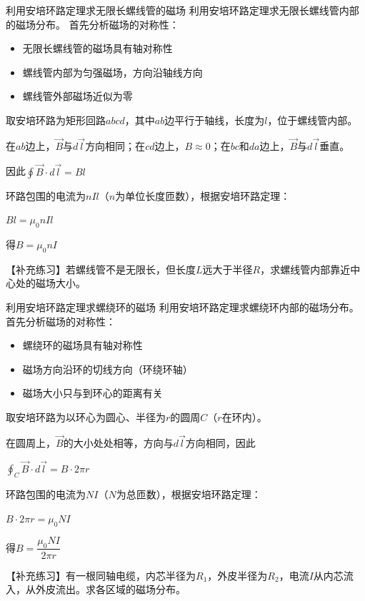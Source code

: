 \begin{example}{利用安培环路定理求无限长螺线管的磁场}
    利用安培环路定理求无限长螺线管内部的磁场分布。
    \tcblower
    首先分析磁场的对称性：
    \begin{itemize}
        \item 无限长螺线管的磁场具有轴对称性
        \item 螺线管内部为匀强磁场，方向沿轴线方向
        \item 螺线管外部磁场近似为零
    \end{itemize}

    取安培环路为矩形回路$abcd$，其中$ab$边平行于轴线，长度为$l$，位于螺线管内部。

    在$ab$边上，$\vec{B}$与$d\vec{l}$方向相同；在$cd$边上，$B\approx0$；在$bc$和$da$边上，$\vec{B}$与$d\vec{l}$垂直。

    因此$\displaystyle\oint\vec{B}\cdot d\vec{l}=Bl$

    环路包围的电流为$nIl$（$n$为单位长度匝数），根据安培环路定理：

    $Bl=\mu_0 nIl$

    得$B=\mu_0 nI$

    \tcbline
    【补充练习】若螺线管不是无限长，但长度$L$远大于半径$R$，求螺线管内部靠近中心处的磁场大小。
\end{example}

\begin{example}{利用安培环路定理求螺绕环的磁场}
    利用安培环路定理求螺绕环内部的磁场分布。
    \tcblower
    首先分析磁场的对称性：
    \begin{itemize}
        \item 螺绕环的磁场具有轴对称性
        \item 磁场方向沿环的切线方向（环绕环轴）
        \item 磁场大小只与到环心的距离有关
    \end{itemize}

    取安培环路为以环心为圆心、半径为$r$的圆周$C$（$r$在环内）。

    在圆周上，$\vec{B}$的大小处处相等，方向与$d\vec{l}$方向相同，因此

    $\displaystyle\oint_C\vec{B}\cdot d\vec{l}=B\cdot 2\pi r$

    环路包围的电流为$NI$（$N$为总匝数），根据安培环路定理：

    $B\cdot 2\pi r=\mu_0 NI$

    得$B=\dfrac{\mu_0 NI}{2\pi r}$


    \tcbline
    【补充练习】有一根同轴电缆，内芯半径为$R_1$，外皮半径为$R_2$，电流$I$从内芯流入，从外皮流出。求各区域的磁场分布。
\end{example}

